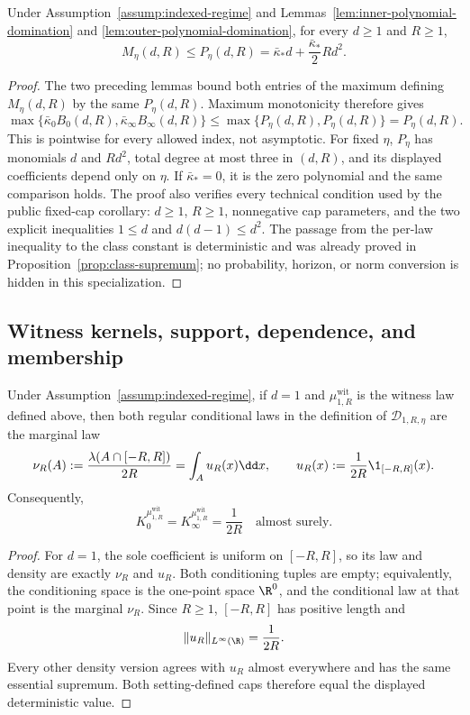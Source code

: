 \begin{proposition}
\label{prop:fixed-eta-polynomial-specialization}
Under Assumption~\ref{assump:indexed-regime} and
Lemmas~\ref{lem:inner-polynomial-domination} and
\ref{lem:outer-polynomial-domination}, for every $d\geq1$ and $R\geq1$,
\[
M_\eta(d,R)\leq P_\eta(d,R)
=\bar\kappa_*d+\frac{\bar\kappa_*}{2}Rd^2.
\]
\end{proposition}

\begin{proof}
The two preceding lemmas bound both entries of the maximum defining
$M_\eta(d,R)$ by the same $P_\eta(d,R)$.  Maximum monotonicity therefore
gives
\[
\max\{\bar\kappa_0B_0(d,R),\bar\kappa_\infty B_\infty(d,R)\}
\leq\max\{P_\eta(d,R),P_\eta(d,R)\}=P_\eta(d,R).
\]
This is pointwise for every allowed index, not asymptotic.  For fixed $\eta$,
$P_\eta$ has monomials $d$ and $Rd^2$, total degree at most three in
$(d,R)$, and its displayed coefficients depend only on $\eta$.  If
$\bar\kappa_*=0$, it is the zero polynomial and the same comparison holds.
The proof also verifies every technical condition used by the public
fixed-cap corollary: $d\geq1$, $R\geq1$, nonnegative cap parameters, and the
two explicit inequalities $1\leq d$ and $d(d-1)\leq d^2$.  The passage from
the per-law inequality to the class constant is deterministic and was
already proved in Proposition~\ref{prop:class-supremum}; no probability,
horizon, or norm conversion is hidden in this specialization.
\end{proof}

\subsection{Witness kernels, support, dependence, and membership}
\label{app:witness}

\begin{proposition}
\label{prop:degree-one-witness-kernels}
Under Assumption~\ref{assump:indexed-regime}, if $d=1$ and
$\mu^{\mathrm{wit}}_{1,R}$ is the witness law defined above, then both
regular conditional laws in the definition of
$\mathcal D_{1,R,\eta}$ are the marginal law
\[
\nu_R(A):=\frac{\lambda(A\cap[-R,R])}{2R}
=\int_Au_R(x)\dd x,
\qquad
u_R(x):=\frac1{2R}\1_{[-R,R]}(x).
\]
Consequently,
\[
K_0^{\mu^{\mathrm{wit}}_{1,R}}
=K_\infty^{\mu^{\mathrm{wit}}_{1,R}}
=\frac1{2R}
\quad\text{almost surely}.
\]
\end{proposition}

\begin{proof}
For $d=1$, the sole coefficient is uniform on $[-R,R]$, so its law and
density are exactly $\nu_R$ and $u_R$.  Both conditioning tuples are empty;
equivalently, the conditioning space is the one-point space $\R^0$, and the
conditional law at that point is the marginal $\nu_R$.  Since $R\geq1$,
$[-R,R]$ has positive length and
\[
\|u_R\|_{L^\infty(\R)}=\frac1{2R}.
\]
Every other density version agrees with $u_R$ almost everywhere and has the
same essential supremum.  Both setting-defined caps therefore equal the
displayed deterministic value.
\end{proof}

